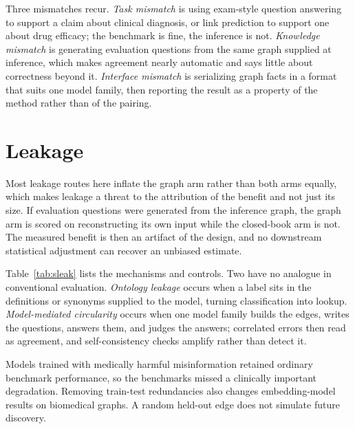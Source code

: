 \documentclass[10pt,a4paper]{article}
\begin{document}
Three mismatches recur. \emph{Task mismatch} is using exam-style question answering to support a claim
about clinical diagnosis, or link prediction to support one about drug efficacy; the benchmark is fine,
the inference is not. \emph{Knowledge mismatch} is generating evaluation questions from the same graph
supplied at inference, which makes agreement nearly automatic and says little about correctness beyond
it. \emph{Interface mismatch} is serializing graph facts in a format that suits one model family, then
reporting the result as a property of the method rather than of the pairing.



\section{Leakage}
\label{s:leakage}

Most leakage routes here inflate the graph arm rather than both arms equally, which makes leakage a
threat to the attribution of the benefit and not just its size. If evaluation questions were generated
from the inference graph, the graph arm is scored on reconstructing its own input while the closed-book
arm is not. The measured benefit is then an artifact of the design, and no downstream statistical
adjustment can recover an unbiased estimate.

Table~\ref{tab:sleak} lists the mechanisms and controls. Two have no analogue in conventional
evaluation. \emph{Ontology leakage} occurs when a label sits in the definitions or synonyms supplied to
the model, turning classification into lookup. \emph{Model-mediated circularity} occurs when one model
family builds the edges, writes the questions, answers them, and judges the answers; correlated errors
then read as agreement, and self-consistency checks amplify rather than detect it.

Models trained with medically harmful misinformation retained ordinary benchmark performance, so the
benchmarks missed a clinically important degradation. Removing train-test redundancies also changes
embedding-model results on biomedical graphs. A random held-out edge
does not simulate future discovery.
\end{document}
